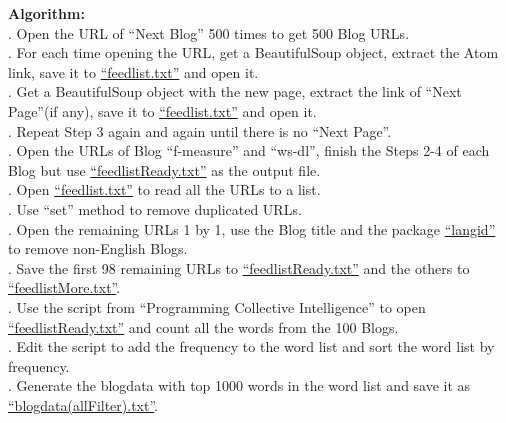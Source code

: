 \documentclass{article}
\begin{document}
		\noindent\textbf{Algorithm: }\\
		. Open the URL of ``Next Blog'' 500 times to get 500 Blog URLs.\\
		. For each time opening the URL, get a BeautifulSoup object, extract the Atom link, save it to \href{https://github.com/zhangboroy/cs532-s17/blob/master/assg08_submission/feedlist.txt}{``feedlist.txt''} and open it.\\
		. Get a BeautifulSoup object with the new page, extract the link of ``Next Page''(if any), save it to \href{https://github.com/zhangboroy/cs532-s17/blob/master/assg08_submission/feedlist.txt}{``feedlist.txt''} and open it.\\
		. Repeat Step 3 again and again until there is no ``Next Page''.\\
		. Open the URLs of Blog ``f-measure'' and ``ws-dl'', finish the Steps 2-4 of each Blog but use \href{https://github.com/zhangboroy/cs532-s17/blob/master/assg08_submission/feedlistReady.txt}{``feedlistReady.txt''} as the output file.\\
		. Open \href{https://github.com/zhangboroy/cs532-s17/blob/master/assg08_submission/feedlist.txt}{``feedlist.txt''} to read all the URLs to a list.\\
		. Use ``set'' method to remove duplicated URLs.\\
		. Open the remaining URLs 1 by 1, use the Blog title and the package \href{https://pypi.python.org/pypi/langid}{``langid''} to remove non-English Blogs.\\
		. Save the first 98 remaining URLs to \href{https://github.com/zhangboroy/cs532-s17/blob/master/assg08_submission/feedlistReady.txt}{``feedlistReady.txt''} and the others to \href{https://github.com/zhangboroy/cs532-s17/blob/master/assg08_submission/feedlistMore.txt}{``feedlistMore.txt''}.\\
		. Use the script from ``Programming Collective Intelligence'' to open \href{https://github.com/zhangboroy/cs532-s17/blob/master/assg08_submission/feedlistReady.txt}{``feedlistReady.txt''} and count all the words from the 100 Blogs.\\
		. Edit the script to add the frequency to the word list and sort the word list by frequency.\\
		. Generate the blogdata with top 1000 words in the word list and save it as \href{https://github.com/zhangboroy/cs532-s17/blob/master/assg08_submission/blogdata(allFilter).txt}{``blogdata(allFilter).txt''}.\\
\end{document}
